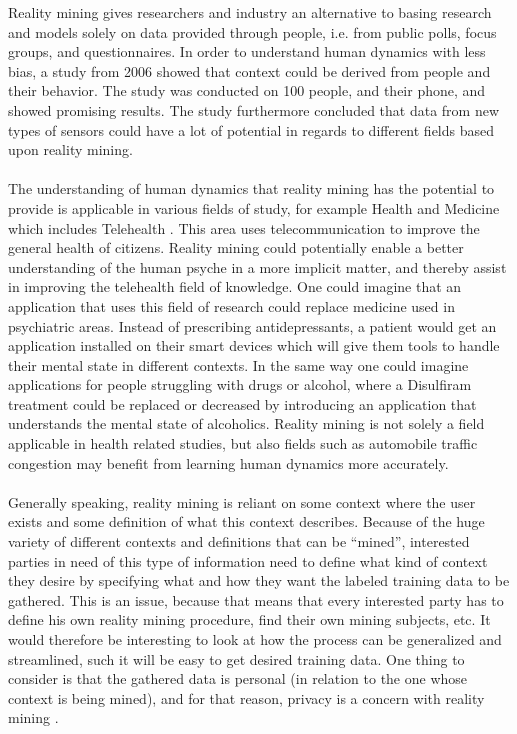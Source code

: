 Reality mining gives researchers and industry an alternative to basing research and models solely on data provided through people, i.e. from public polls, focus groups, and questionnaires. In order to understand human dynamics with less bias, a study from 2006 \parencite{eagle2006_reality_mining_definition} showed that context could be derived from people and their behavior. The study was conducted on 100 people, and their phone, and showed promising results. The study furthermore concluded that data from new types of sensors could have a lot of potential in regards to different fields based upon reality mining. 
\\\\
The understanding of human dynamics that reality mining has the potential to provide is applicable in various fields of study, for example Health and Medicine \parencite{pentland2009_reality_mining_health_medicine} which includes Telehealth \parencite{telehealth_aau}. This area uses telecommunication to improve the general health of citizens. Reality mining could potentially enable a better understanding of the human psyche in a more implicit matter, and thereby assist in improving the telehealth field of knowledge. One could imagine that an application that uses this field of research could replace medicine used in psychiatric areas. Instead of prescribing antidepressants, a patient would get an application installed on their smart devices which will give them tools to handle their mental state in different contexts. In the same way one could imagine applications for people struggling with drugs or alcohol, where a Disulfiram \parencite{nlm_disulfiram} treatment could be replaced or decreased by introducing an application that understands the mental state of alcoholics. Reality mining is not solely a field applicable in health related studies, but also fields such as automobile traffic congestion \parencite{pentland2009reality_mining_mobile_communication_gps} may benefit from learning human dynamics more accurately.
\\\\
Generally speaking, reality mining is reliant on some context where the user exists and some definition of what this context describes. Because of the huge variety of different contexts and definitions that can be ``mined'', interested parties in need of this type of information need to define what kind of context they desire by specifying what and how they want the labeled training data to be gathered. This is an issue, because that means that every interested party has to define his own reality mining procedure, find their own mining subjects, etc. It would therefore be interesting to look at how the process can be generalized and streamlined, such it will be easy to get desired training data. One thing to consider is that the gathered data is personal (in relation to the one whose context is being mined), and for that reason, privacy is a concern with reality mining \parencite{madan2009_reality_mining_privacy}. 
